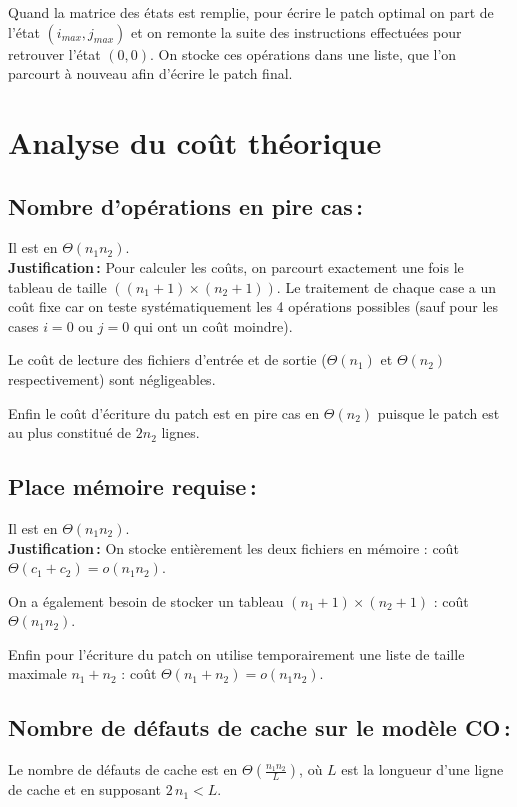 \documentclass[a4paper, 10pt, french]{article}
\begin{document}
Quand la matrice des états est remplie, pour écrire le patch optimal on part de l'état $(i_{max}, j_{max})$
et on remonte la suite des instructions effectuées pour retrouver l'état $(0,0)$.
On stocke ces opérations dans une liste, que l'on parcourt à nouveau afin d'écrire le patch final.

\section{Analyse du coût théorique}

  \subsection{Nombre  d'opérations en pire cas\,: }
    Il est en $\Theta(n_1 n_2)$.\\

    \textbf{Justification\,:} Pour calculer les coûts, on parcourt exactement une fois le tableau de taille $((n_1 +1)\times(n_2 +1))$.
    Le traitement de chaque case a un coût fixe car on teste systématiquement les 4 opérations possibles (sauf pour les cases $i=0$ ou $j=0$ qui ont un coût moindre).

    Le coût de lecture des fichiers d'entrée et de sortie ($\Theta(n_1)$ et $\Theta(n_2)$ respectivement) sont négligeables.

    Enfin le coût d'écriture du patch est en pire cas en $\Theta(n_2)$ puisque le patch est au plus constitué de $2n_2$ lignes.

  \subsection{Place mémoire requise\,: }
    Il est en $\Theta(n_1 n_2)$.\\

    \textbf{Justification\,:} On stocke entièrement les deux fichiers en mémoire : coût $\Theta(c_1 + c_2) = o(n_1n_2)$.

    On a également besoin de stocker un tableau $(n_1+1)\times(n_2+1)$ : coût $\Theta(n_1n_2)$.

    Enfin pour l'écriture du patch on utilise temporairement une liste de taille maximale $n_1 + n_2$ : coût $\Theta(n_1 + n_2) = o(n_1n_2)$.

  \subsection{Nombre de défauts de cache sur le modèle CO\,: }
  	Le nombre de défauts de cache est en $\Theta \left (\frac{n_1n_2}{L} \right )$, où $L$ est la longueur d'une ligne de cache et en supposant $2 \, n_1 < L$.\\
  	
\end{document}
